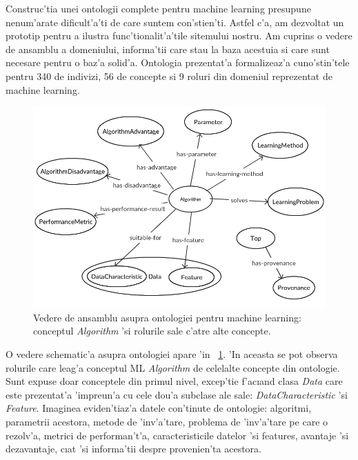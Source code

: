 \documentclass[12pt,a4paper,twoside]{report}
\begin{document}
Construc'tia unei ontologii complete pentru machine learning presupune nenum'arate dificult'a'ti de care suntem con'stien'ti. Astfel c'a, am dezvoltat un prototip pentru a ilustra func'tionalit'a'tile sitemului nostru. Am cuprins o vedere de ansamblu a domeniului, informa'tii care stau la baza acestuia si care sunt necesare pentru o baz'a solid'a. Ontologia prezentat'a formalizeaz'a cuno'stin'tele pentru 340 de indivizi, 56 de concepte si 9 roluri din domeniul reprezentat de machine learning.

\begin{figure}[ht]
    \centering
    \includegraphics[width = 0.85 \linewidth]{img/ontologie_black.png}
        \caption{Vedere de ansamblu asupra ontologiei pentru machine learning: conceptul {\it Algorithm} 'si rolurile sale c'atre alte concepte.}
    \label{fig:onto}
\end{figure}

O vedere schematic'a asupra ontologiei apare 'in ~\ref{fig:onto}. 'In aceasta se pot observa rolurile care leag'a conceptul ML {\it Algorithm} de celelalte concepte din ontologie. Sunt expuse doar conceptele din primul nivel, excep'tie f'ac\i and clasa {\it Data} care este prezentat'a 'impreun'a cu cele dou'a subclase ale sale: {\it DataCharacteristic} 'si {\it Feature}. Imaginea eviden'tiaz'a datele con'tinute de ontologie: algoritmi, parametrii acestora, metode de 'inv'a'tare, problema de 'inv'a'tare pe care o rezolv'a, metrici de performan't'a, caracteristicile datelor 'si features, avantaje 'si dezavantaje, c\i at 'si informa'tii despre provenien'ta acestora.
\end{document}
